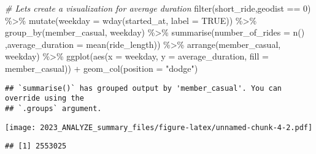 \documentclass[
]{article}
\newenvironment{Shaded}{\begin{snugshade}}{\end{snugshade}}
\newcommand{\AttributeTok}[1]{\textcolor[rgb]{0.77,0.63,0.00}{#1}}
\newcommand{\CommentTok}[1]{\textcolor[rgb]{0.56,0.35,0.01}{\textit{#1}}}
\newcommand{\ConstantTok}[1]{\textcolor[rgb]{0.00,0.00,0.00}{#1}}
\newcommand{\DecValTok}[1]{\textcolor[rgb]{0.00,0.00,0.81}{#1}}
\newcommand{\FunctionTok}[1]{\textcolor[rgb]{0.00,0.00,0.00}{#1}}
\newcommand{\NormalTok}[1]{#1}
\newcommand{\SpecialCharTok}[1]{\textcolor[rgb]{0.00,0.00,0.00}{#1}}
\newcommand{\StringTok}[1]{\textcolor[rgb]{0.31,0.60,0.02}{#1}}
\begin{document}
\begin{Shaded}
\begin{Highlighting}[]
\CommentTok{\# Let\textquotesingle{}s create a visualization for average duration}
\FunctionTok{filter}\NormalTok{(short\_ride,geodist }\SpecialCharTok{==} \DecValTok{0}\NormalTok{) }\SpecialCharTok{\%\textgreater{}\%} 
  \FunctionTok{mutate}\NormalTok{(}\AttributeTok{weekday =} \FunctionTok{wday}\NormalTok{(started\_at, }\AttributeTok{label =} \ConstantTok{TRUE}\NormalTok{)) }\SpecialCharTok{\%\textgreater{}\%} 
  \FunctionTok{group\_by}\NormalTok{(member\_casual, weekday) }\SpecialCharTok{\%\textgreater{}\%} 
  \FunctionTok{summarise}\NormalTok{(}\AttributeTok{number\_of\_rides =} \FunctionTok{n}\NormalTok{()}
\NormalTok{            ,}\AttributeTok{average\_duration =} \FunctionTok{mean}\NormalTok{(ride\_length)) }\SpecialCharTok{\%\textgreater{}\%} 
  \FunctionTok{arrange}\NormalTok{(member\_casual, weekday)  }\SpecialCharTok{\%\textgreater{}\%} 
  \FunctionTok{ggplot}\NormalTok{(}\FunctionTok{aes}\NormalTok{(}\AttributeTok{x =}\NormalTok{ weekday, }\AttributeTok{y =}\NormalTok{ average\_duration, }\AttributeTok{fill =}\NormalTok{ member\_casual)) }\SpecialCharTok{+}
  \FunctionTok{geom\_col}\NormalTok{(}\AttributeTok{position =} \StringTok{"dodge"}\NormalTok{)}
\end{Highlighting}
\end{Shaded}

\begin{verbatim}
## `summarise()` has grouped output by 'member_casual'. You can override using the
## `.groups` argument.
\end{verbatim}

\texttt{[image: 2023\_ANALYZE\_summary\_files/figure-latex/unnamed-chunk-4-2.pdf]}

\begin{Shaded}
\end{Shaded}

\begin{verbatim}
## [1] 2553025
\end{verbatim}

\begin{Shaded}
\end{Shaded}
\end{document}
